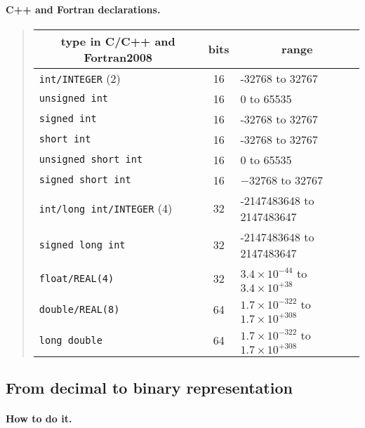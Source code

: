 \documentclass[%
oneside,                 %
final,                   %
10pt]{article}
\begin{document}
\paragraph{C++ and Fortran declarations.}


\begin{quote}
\begin{tabular}{lcl}
\hline
\multicolumn{1}{c}{ type in C/C++ and Fortran2008 } & \multicolumn{1}{c}{ bits } & \multicolumn{1}{c}{ range } \\
\hline
\Verb!int/INTEGER! (2)          & 16   & -32768 to 32767                                \\
\Verb!unsigned int!             & 16   & 0 to 65535                                     \\
\Verb!signed int!               & 16   & -32768 to 32767                                \\
\Verb!short int!                & 16   & -32768 to 32767                                \\
\Verb!unsigned short int!       & 16   & 0 to 65535                                     \\
\Verb!signed short int!         & 16   & $-32768$ to 32767                              \\
\Verb!int/long int/INTEGER! (4) & 32   & -2147483648 to 2147483647                      \\
\Verb!signed long int!          & 32   & -2147483648 to 2147483647                      \\
\Verb!float/REAL(4)!            & 32   & $3.4\times 10^{-44}$ to $3.4\times 10^{+38}$   \\
\Verb!double/REAL(8)!           & 64   & $1.7\times 10^{-322}$ to $1.7\times 10^{+308}$ \\
\Verb!long double!              & 64   & $1.7\times 10^{-322}$ to $1.7\times 10^{+308}$ \\
\hline
\end{tabular}
\end{quote}

\noindent




\subsection*{From decimal to binary representation}

\paragraph{How to do it.}
\end{document}
